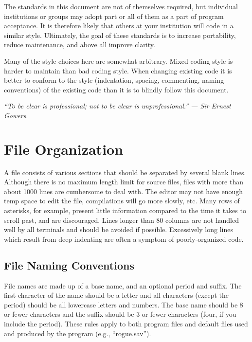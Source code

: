  The standards in this document are not of themselves required, but individual
institutions or groups may adopt part or all of them as a part of program
acceptance. It is therefore likely that others at your institution will code in
a similar style. Ultimately, the goal of these standards is to increase
portability, reduce maintenance, and above all improve clarity. 

 Many of the style choices here are somewhat arbitrary. Mixed coding style is
harder to maintain than bad coding style. When changing existing code it is
better to conform to the style (indentation, spacing, commenting, naming
conventions) of the existing code than it is to blindly follow this document. 

\bigskip\noindent
{\em ``To be clear is professional; not to be clear is unprofessional.'' ---
Sir Ernest  Gowers}.

\section{File Organization}
 A file consists of various sections that should be separated by several blank
lines. Although there is no maximum length limit for source files, files with
more than about 1000 lines are cumbersome to deal with. The editor may not have
enough temp space to edit the file, compilations will go more slowly, etc. Many
rows of asterisks, for example, present little information compared to the time
it takes to scroll past, and are discouraged. Lines longer than 80 columns are
not handled well by all terminals and should be avoided if possible.
Excessively long lines which result from deep indenting are often a symptom of
poorly-organized code. 

\subsection{File Naming Conventions}

 File names are made up of a base name, and an optional period and suffix. The
first character of the name should be a letter and all characters (except the
period) should be all lowercase letters and numbers. The base name should be
8 or fewer characters and the suffix should be 3 or fewer characters (four, if
you include the period). These rules apply to both program files and default
files used and produced by the program (e.g., ``rogue.sav''). 

